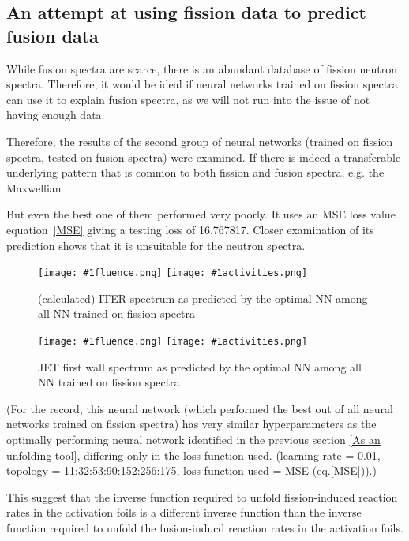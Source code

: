 \documentclass[a4paper, 12pt]{article}
\newcommand{\fluenceandactivities}[1]{
\texttt{[image: \#1fluence.png]}
\texttt{[image: \#1activities.png]}
}
\begin{document}
\subsection{An attempt at using fission data to predict fusion data}
While fusion spectra are scarce, there is an abundant database of fission neutron spectra. Therefore, it would be ideal if neural networks trained on fission spectra can use it to explain fusion spectra, as we will not run into the issue of not having enough data.

Therefore, the results of the second group of neural networks (trained on fission spectra, tested on fusion spectra) were examined. If there is indeed a transferable underlying pattern that is common to both fission and fusion spectra, e.g. the Maxwellian

But even the best one of them performed very poorly. It uses an MSE loss value equation~\ref{MSE} giving a testing loss of 16.767817. Closer examination of its prediction shows that it is unsuitable for the neutron spectra.

\begin{figure}[H]
\centering
\fluenceandactivities{/home/ocean/Documents/GitHubDir/unfolding/unfolding/unfoldingsuite/neuralnetwork/realoutputEarlyStopping/SelectedNNreplicated/fission-fusion/0927_0226_5_layer_test_mse_1_test_007_}
\caption{(calculated) ITER spectrum as predicted by the optimal NN among all NN trained on fission spectra} \label{fission-fusionBad}
\end{figure}

\begin{figure}[H]
\centering
\fluenceandactivities{/home/ocean/Documents/GitHubDir/unfolding/unfolding/unfoldingsuite/neuralnetwork/realoutputEarlyStopping/SelectedNNreplicated/fission-fusion/0927_0226_5_layer_test_mse_1_test_016_}
\caption{JET first wall spectrum as predicted by the optimal NN among all NN trained on fission spectra}\label{fission-fusionGood}
\end{figure}

(For the record, this neural network (which performed the best out of all neural networks trained on fission spectra) has very similar hyperparameters as the optimally performing neural network identified in the previous section \ref{As an unfolding tool}, differing only in the loss function used. (learning rate = 0.01, topology = 11:32:53:90:152:256:175, loss function used = MSE (eq.\ref{MSE})).)

This suggest that the inverse function required to unfold fission-induced reaction rates in the activation foils is a different inverse function than the inverse function required to unfold the fusion-inducd reaction rates in the activation foils.%
\end{document}
